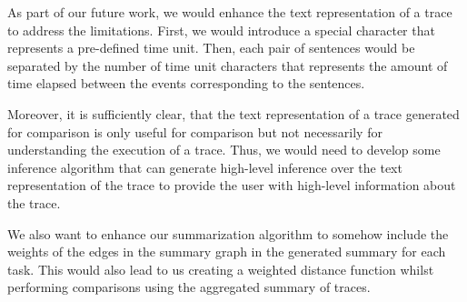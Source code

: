 As part of our future work, we would enhance the text representation of a trace to address the limitations.
First, we would introduce a special character that represents a pre-defined time unit. Then, each pair
of sentences would be separated by the number of time unit characters that represents the amount of time
elapsed between the events corresponding to the sentences.

Moreover, it is sufficiently clear, that the text representation of a trace generated for comparison is only useful
for comparison but not necessarily for understanding the execution of a trace. Thus, we would need to develop
some inference algorithm that can generate high-level inference over the text representation of the trace
to provide the user with high-level information about the trace.

We also want to enhance our summarization algorithm to somehow include the weights of the edges in the summary graph
in the generated summary for each task. This would also lead to us creating a weighted distance function whilst performing
comparisons using the aggregated summary of traces.